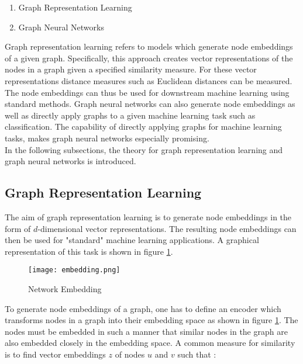 	\begin{enumerate}
		\item Graph Representation Learning
		\item Graph Neural Networks
	\end{enumerate}
	
	\noindent Graph representation learning refers to models which generate node
	embeddings of a given graph. Specifically, this approach creates vector 
	representations of the nodes in a graph given a specified similarity measure. 
	For these vector representations distance measures such as Euclidean 
	distances can be measured. The node embeddings can thus be used for
	downstream machine learning using standard methods. Graph neural networks 
	can also generate node embeddings as well as directly apply graphs to a 
	given machine learning task such as classification. The capability of
	directly applying graphs for machine learning tasks, makes graph neural 
	networks especially promising. \\

	\noindent In the following subsections, the theory for graph representation 
	learning and graph neural networks is introduced. 

	\subsection{Graph Representation Learning}

	The aim of graph representation learning is to generate node embeddings in 
	the form of $d$-dimensional vector representations. The resulting node 
	embeddings can then be used for "standard" machine learning applications. 
	A graphical representation of this task is shown in figure 
	\ref{fig:embedding}.

	\begin{figure}[h]
		\centering
		\texttt{[image: embedding.png]}
		\caption{Network Embedding}
		\cite{leskovec2021lecture}
		\label{fig:embedding}
	\end{figure}

	\noindent To generate node embeddings of a graph, one has to define an
	encoder which transforms nodes in a graph into their embedding space as
	shown in figure \ref{fig:embedding}. The nodes must be embedded in such a
	manner that similar nodes in the graph are also embedded closely in the 
	embedding space. A common measure for similarity is to find vector embeddings 
	$z$ of nodes $u$ and $v$ such that \citep{leskovec2021lecture}:


